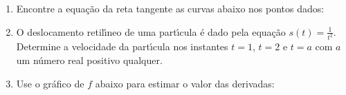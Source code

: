 \documentclass[a4paper,5pt]{amsbook}
\newcommand{\ds}{\displaystyle}
\begin{document}
\vspace{1cm}
\begin{enumerate}
    \vspace{0.5cm}
    \item Encontre a equa\c{c}\~ao da reta tangente as curvas abaixo nos pontos
        dados:

        \noindent{}

    \vspace{0.5cm}
    \item O deslocamento retil\'{\i}neo de uma part\'{\i}cula \'e dado pela equa\c{c}\~ao
        $s(t)=\ds\frac{1}{t^2}$. Determine a velocidade da part\'{\i}cula nos
        instantes $t=1$, $t=2$ e $t=a$ com $a$ um n\'umero real positivo
        qualquer.

    \vspace{0.5cm}
    \item Use o gr\'afico de $f$ abaixo para estimar o valor das derivadas:

        \noindent{}


\end{enumerate}
\end{document}
